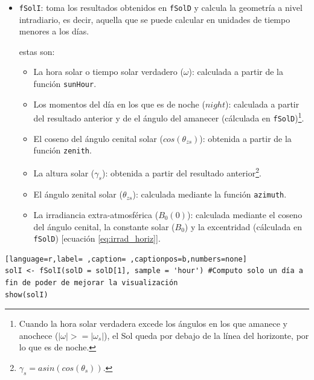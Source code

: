 \begin{itemize}
\item \texttt{fSolI}: toma los resultados obtenidos en \texttt{fSolD} y calcula la geometría a nivel intradiario, es decir, aquella que se puede calcular en unidades de tiempo menores a los días.

estas son:
\begin{itemize}
\item La hora solar o tiempo solar verdadero (\(\omega\)): calculada a partir de la función \texttt{sunHour}.
\item Los momentos del día en los que es de noche (\(night\)): calculada a partir del resultado anterior y de el ángulo del amanecer (cálculada en \texttt{fSolD})\footnote{Cuando la hora solar verdadera excede los ángulos en los que amanece y anochece (\(|\omega|>=|\omega_s|\)), el Sol queda por debajo de la línea del horizonte, por lo que es de noche.}.
\item El coseno del ángulo cenital solar (\(cos(\theta_{zs})\)): obtenida a partir de la función \texttt{zenith}.
\item La altura solar (\(\gamma_s\)): obtenida a partir del resultado anterior\footnote{\(\gamma_s=asin(cos(\theta_s))\).}.
\item El ángulo zenital solar (\(\theta_{zs}\)): calculada mediante la función \texttt{azimuth}.
\item La irradiancia extra-atmosférica (\(B_0(0)\)): calculada mediante el coseno del ángulo cenital, la constante solar (\(B_0\)) y la excentridad (cálculada en \texttt{fSolD}) [ecuación \ref{eq:irrad_horiz}].
\end{itemize}
\end{itemize}
\begin{lstlisting}[language=r,label= ,caption= ,captionpos=b,numbers=none]
solI <- fSolI(solD = solD[1], sample = 'hour') #Computo solo un día a fin de poder de mejorar la visualización
show(solI)
\end{lstlisting}

